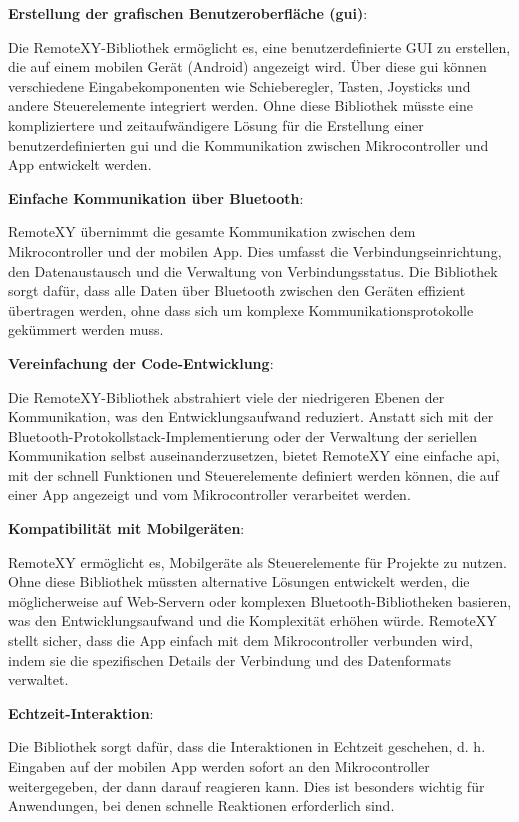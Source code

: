 \textbf{Erstellung der grafischen Benutzeroberfläche (\ac{gui})}:

Die RemoteXY-Bibliothek ermöglicht es, eine benutzerdefinierte GUI zu erstellen, die auf einem mobilen Gerät (Android) angezeigt wird. Über diese \ac{gui} können verschiedene Eingabekomponenten wie Schieberegler, Tasten, Joysticks und andere Steuerelemente integriert werden. Ohne diese Bibliothek müsste eine kompliziertere und zeitaufwändigere Lösung für die Erstellung einer benutzerdefinierten \ac{gui} und die Kommunikation zwischen Mikrocontroller und App entwickelt werden.\vspace{0.3cm}

\textbf{Einfache Kommunikation über Bluetooth}:

RemoteXY übernimmt die gesamte Kommunikation zwischen dem Mikrocontroller und der mobilen App. Dies umfasst die Verbindungseinrichtung, den Datenaustausch und die Verwaltung von Verbindungsstatus. Die Bibliothek sorgt dafür, dass alle Daten über Bluetooth zwischen den Geräten effizient übertragen werden, ohne dass sich um komplexe Kommunikationsprotokolle gekümmert werden muss.\vspace{0.3cm}

\textbf{Vereinfachung der Code-Entwicklung}:

Die RemoteXY-Bibliothek abstrahiert viele der niedrigeren Ebenen der Kommunikation, was den Entwicklungsaufwand reduziert. Anstatt sich mit der Bluetooth-Protokollstack-Implementierung oder der Verwaltung der seriellen Kommunikation selbst auseinanderzusetzen, bietet RemoteXY eine einfache \ac{api}, mit der schnell Funktionen und Steuerelemente definiert werden können, die auf einer App angezeigt und vom Mikrocontroller verarbeitet werden.\vspace{0.3cm}

\textbf{Kompatibilität mit Mobilgeräten}:

RemoteXY ermöglicht es, Mobilgeräte als Steuerelemente für Projekte zu nutzen. Ohne diese Bibliothek müssten alternative Lösungen entwickelt werden, die möglicherweise auf Web-Servern oder komplexen Bluetooth-Bibliotheken basieren, was den Entwicklungsaufwand und die Komplexität erhöhen würde. RemoteXY stellt sicher, dass die App einfach mit dem Mikrocontroller verbunden wird, indem sie die spezifischen Details der Verbindung und des Datenformats verwaltet.\vspace{0.3cm}

\textbf{Echtzeit-Interaktion}:

Die Bibliothek sorgt dafür, dass die Interaktionen in Echtzeit geschehen, d. h. Eingaben auf der mobilen App werden sofort an den Mikrocontroller weitergegeben, der dann darauf reagieren kann. Dies ist besonders wichtig für Anwendungen, bei denen schnelle Reaktionen erforderlich sind.\cite{EVCodeLabs:2025b,EVCodeLabs:2025h,EVCodeLabs:2025i}


